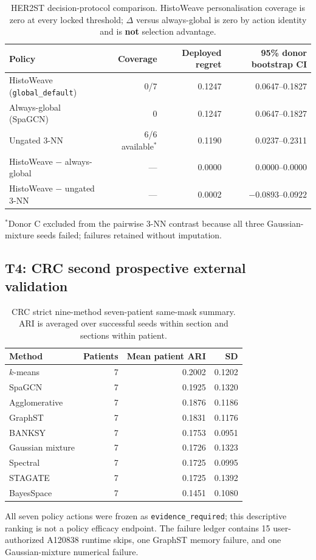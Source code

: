 \documentclass[11pt]{article}
\begin{document}
\begin{table}[ht]
\centering
\caption{HER2ST decision-protocol comparison. HistoWeave personalisation
coverage is zero at every locked threshold; $\Delta$ versus always-global is
zero by action identity and is \textbf{not} selection advantage.
\label{tab:si-her2-policy}}
\begin{tabular}{@{}lrrr@{}}
\toprule
Policy & Coverage & Deployed regret & 95\% donor bootstrap CI \\
\midrule
HistoWeave (\texttt{global\_default}) & 0/7 & 0.1247 & 0.0647--0.1827 \\
Always-global (SpaGCN) & 0 & 0.1247 & 0.0647--0.1827 \\
Ungated 3-NN & 6/6 available$^\ast$ & 0.1190 & 0.0237--0.2311 \\
\midrule
HistoWeave $-$ always-global & --- & 0.0000 & 0.0000--0.0000 \\
HistoWeave $-$ ungated 3-NN & --- & 0.0002 & $-0.0893$--$0.0922$ \\
\bottomrule
\end{tabular}

\vspace{0.4em}
{\footnotesize $^\ast$Donor C excluded from the pairwise 3-NN contrast because
all three Gaussian-mixture seeds failed; failures retained without imputation.}
\end{table}

\subsection{T4: CRC second prospective external validation}

\begin{table}[ht]
\centering
\caption{CRC strict nine-method seven-patient same-mask summary. ARI is
averaged over successful seeds within section and sections within patient.
\label{tab:si-crc-methods}}
\begin{tabular}{@{}lrrr@{}}
\toprule
Method & Patients & Mean patient ARI & SD \\
\midrule
\(k\)-means & 7 & 0.2002 & 0.1202 \\
SpaGCN & 7 & 0.1925 & 0.1320 \\
Agglomerative & 7 & 0.1876 & 0.1186 \\
GraphST & 7 & 0.1831 & 0.1176 \\
BANKSY & 7 & 0.1753 & 0.0951 \\
Gaussian mixture & 7 & 0.1726 & 0.1323 \\
Spectral & 7 & 0.1725 & 0.0995 \\
STAGATE & 7 & 0.1725 & 0.1392 \\
BayesSpace & 7 & 0.1451 & 0.1080 \\
\bottomrule
\end{tabular}

\vspace{0.4em}
{\footnotesize All seven policy actions were frozen as
\texttt{evidence\_required}; this descriptive ranking is not a policy efficacy
endpoint. The failure ledger contains 15 user-authorized A120838 runtime skips,
one GraphST memory failure, and one Gaussian-mixture numerical failure.}
\end{table}
\end{document}
